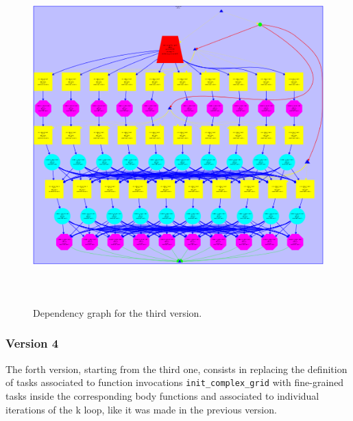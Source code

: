 \documentclass[12]{article}
\begin{document}
\begin{figure}[H]
\centering  \includegraphics[width=\linewidth , height=13cm, width=13cm  ]{images/dependency_graph3.png}
  \caption{Dependency graph for the third version.}
  \label{fig:Depencency3rd}
\end{figure}

\subsubsection{Version 4}
The forth version, starting from the third one, consists in replacing the definition of tasks associated to function invocations \texttt{init\_complex\_grid}  with fine-grained tasks inside the corresponding body functions and associated to individual iterations of the k loop, like it was made in the previous version. 
\end{document}
